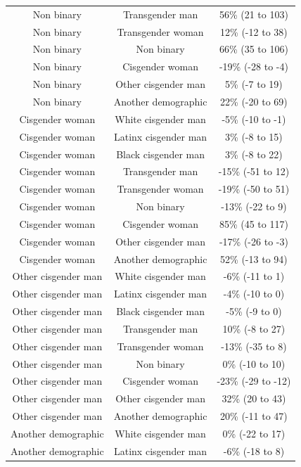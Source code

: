 \documentclass[
  letterpaper,
  DIV=11,
  numbers=noendperiod,
  oneside]{scrreprt}
\begin{document}
\begin{longtable*}{ccc}
Non binary & Transgender man & 56\% (21 to 103)  \\ 
Non binary & Transgender woman & 12\% (-12 to 38)  \\ 
Non binary & Non binary & 66\% (35 to 106)  \\ 
Non binary & Cisgender woman & -19\% (-28 to -4)  \\ 
Non binary & Other cisgender man & 5\% (-7 to 19)  \\ 
Non binary & Another demographic & 22\% (-20 to 69)  \\ 
Cisgender woman & White cisgender man & -5\% (-10 to -1)  \\ 
Cisgender woman & Latinx cisgender man & 3\% (-8 to 15)  \\ 
Cisgender woman & Black cisgender man & 3\% (-8 to 22)  \\ 
Cisgender woman & Transgender man & -15\% (-51 to 12)  \\ 
Cisgender woman & Transgender woman & -19\% (-50 to 51)  \\ 
Cisgender woman & Non binary & -13\% (-22 to 9)  \\ 
Cisgender woman & Cisgender woman & 85\% (45 to 117)  \\ 
Cisgender woman & Other cisgender man & -17\% (-26 to -3)  \\ 
Cisgender woman & Another demographic & 52\% (-13 to 94)  \\ 
Other cisgender man & White cisgender man & -6\% (-11 to 1)  \\ 
Other cisgender man & Latinx cisgender man & -4\% (-10 to 0)  \\ 
Other cisgender man & Black cisgender man & -5\% (-9 to 0)  \\ 
Other cisgender man & Transgender man & 10\% (-8 to 27)  \\ 
Other cisgender man & Transgender woman & -13\% (-35 to 8)  \\ 
Other cisgender man & Non binary & 0\% (-10 to 10)  \\ 
Other cisgender man & Cisgender woman & -23\% (-29 to -12)  \\ 
Other cisgender man & Other cisgender man & 32\% (20 to 43)  \\ 
Other cisgender man & Another demographic & 20\% (-11 to 47)  \\ 
Another demographic & White cisgender man & 0\% (-22 to 17)  \\ 
Another demographic & Latinx cisgender man & -6\% (-18 to 8)  \\ 

\end{longtable*}
\end{document}
